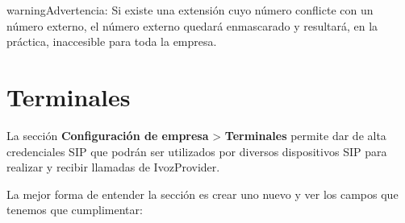 \documentclass[letterpaper,10pt,spanish]{sphinxmanual}
\begin{document}
\begin{notice}{warning}{Advertencia:}
Si existe una extensión cuyo número conflicte con un número externo, el número externo quedará enmascarado y resultará, en la práctica, inaccesible para toda la empresa.
\end{notice}


\section{Terminales}
\label{pbx_features/terminals:terminals}\label{pbx_features/terminals::doc}\label{pbx_features/terminals:terminales}
La sección \textbf{Configuración de empresa} \textgreater{} \textbf{Terminales} permite dar de alta credenciales SIP que podrán ser utilizados por diversos dispositivos SIP para realizar y recibir llamadas de IvozProvider.

La mejor forma de entender la sección es crear uno nuevo y ver los campos que tenemos que cumplimentar:
\end{document}
